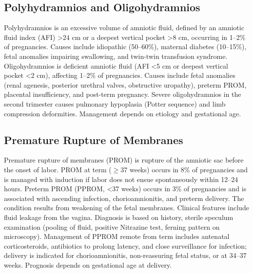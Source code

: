 \subsection{Polyhydramnios and Oligohydramnios}
\label{sec:Polyhydramnios and Oligohydramnios}
Polyhydramnios is an excessive volume of amniotic fluid, defined by an amniotic fluid index (AFI) >24 cm or a deepest vertical pocket >8 cm, occurring in 1--2\% of pregnancies. Causes include idiopathic (50--60\%), maternal diabetes (10--15\%), fetal anomalies impairing swallowing, and twin-twin transfusion syndrome. Oligohydramnios is deficient amniotic fluid (AFI <5 cm or deepest vertical pocket <2 cm), affecting 1--2\% of pregnancies. Causes include fetal anomalies (renal agenesis, posterior urethral valves, obstructive uropathy), preterm PROM, placental insufficiency, and post-term pregnancy. Severe oligohydramnios in the second trimester causes pulmonary hypoplasia (Potter sequence) and limb compression deformities. Management depends on etiology and gestational age.

\subsection{Premature Rupture of Membranes}
\label{sec:Premature Rupture of Membranes}
Premature rupture of membranes (PROM) is rupture of the amniotic sac before the onset of labor. PROM at term ($\ge$37 weeks) occurs in 8\% of pregnancies and is managed with induction if labor does not ensue spontaneously within 12--24 hours. Preterm PROM (PPROM, <37 weeks) occurs in 3\% of pregnancies and is associated with ascending infection, chorioamnionitis, and preterm delivery. The condition results from weakening of the fetal membranes. Clinical features include fluid leakage from the vagina. Diagnosis is based on history, sterile speculum examination (pooling of fluid, positive Nitrazine test, ferning pattern on microscopy). Management of PPROM remote from term includes antenatal corticosteroids, antibiotics to prolong latency, and close surveillance for infection; delivery is indicated for chorioamnionitis, non-reassuring fetal status, or at 34--37 weeks. Prognosis depends on gestational age at delivery.


